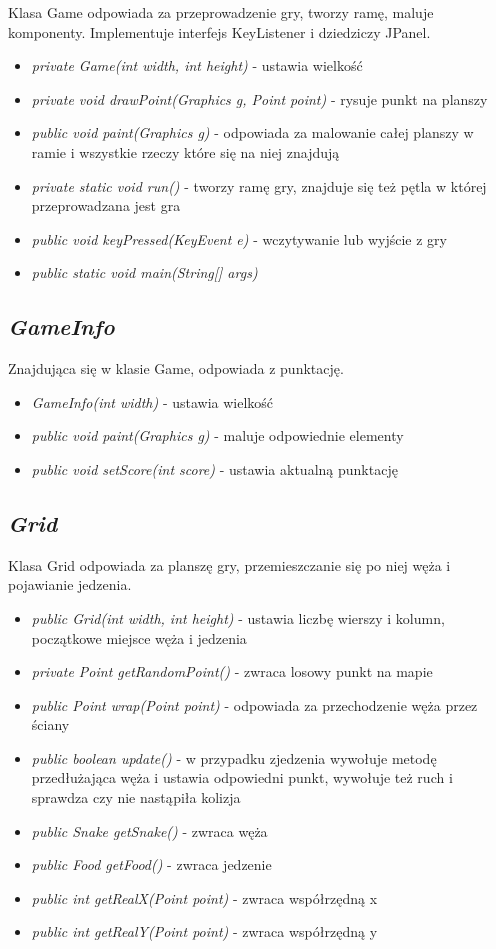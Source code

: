 \documentclass[12pt]{article}
\begin{document}
Klasa Game odpowiada za przeprowadzenie gry, tworzy ramę, maluje komponenty. Implementuje interfejs KeyListener i dziedziczy JPanel.
\begin{itemize}
	\item \textit{private Game(int width, int height)} - ustawia wielkość
	\item \textit{private void drawPoint(Graphics g, Point point)} - rysuje punkt na planszy
	\item \textit{public void paint(Graphics g)} - odpowiada za malowanie całej planszy w ramie  i wszystkie rzeczy które się na niej znajdują
	\item \textit{private static void run()} - tworzy ramę gry, znajduje się też pętla w której przeprowadzana jest gra
	\item \textit{public void keyPressed(KeyEvent e)} - wczytywanie lub wyjście z gry
	\item \textit{public static void main(String[] args)}
\end{itemize}
\subsection{\textbf{\textit{GameInfo}}}

Znajdująca się w klasie Game, odpowiada z punktację.
\begin{itemize}
	\item \textit{GameInfo(int width)} - ustawia  wielkość
	\item \textit{public void paint(Graphics g)} - maluje odpowiednie elementy
	\item \textit{public void setScore(int score)} - ustawia aktualną punktację 
\end{itemize}
\subsection{\textbf{\textit{Grid}}}

Klasa Grid odpowiada za planszę gry, przemieszczanie się po niej węża i pojawianie jedzenia.
\begin{itemize}
	\item \textit{public Grid(int width, int height)} - ustawia liczbę wierszy i kolumn, początkowe miejsce węża i jedzenia
	\item \textit{private Point getRandomPoint()} - zwraca losowy punkt na mapie
	\item \textit{public Point wrap(Point point)} - odpowiada za  przechodzenie węża przez ściany
	\item \textit{public boolean update()} - w przypadku zjedzenia wywołuje metodę przedłużająca węża i ustawia odpowiedni punkt, wywołuje też ruch i sprawdza czy nie nastąpiła kolizja
	\item \textit{public Snake getSnake()} - zwraca węża
	\item \textit{public Food getFood()} - zwraca jedzenie
	\item \textit{public int getRealX(Point point)} - zwraca współrzędną  x
	\item \textit{public int getRealY(Point point)} - zwraca współrzędną y
\end{itemize}
\end{document}
